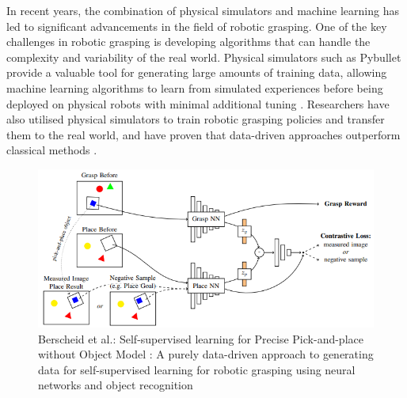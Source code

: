 \documentclass[11pt, a4paper]{report}
\begin{document}
In recent years, the combination of physical simulators and machine learning has led to significant advancements in the field of robotic grasping. One of the key challenges in robotic grasping is developing algorithms that can handle the complexity and variability of the real world. Physical simulators such as Pybullet \cite{coumans2021} provide a valuable tool for generating large amounts of training data, allowing machine learning algorithms to learn from simulated experiences before being deployed on physical robots with minimal additional tuning \cite{berscheid2020selfsupervised}. Researchers have also utilised physical simulators to train robotic grasping policies \cite{Chebotar_2017} and transfer them to the real world, and have proven that data-driven approaches outperform classical methods \cite{zhang2022robotic}.
\begin{figure}[ht]
    \centering
    \includegraphics[width=\textwidth]{docs/Project Report/Media/1_1_berscheid_2020_sl_for_precise_pickandplace_wo_obj_model_network.png}
    \caption{Berscheid et al.: Self-supervised learning for Precise Pick-and-place without Object Model \cite{berscheid2020selfsupervised}: A purely data-driven approach to generating data for self-supervised learning for robotic grasping using neural networks and object recognition}
    \label{fig:1.1}
\end{figure}
\end{document}
